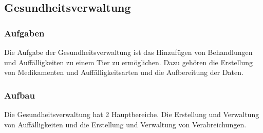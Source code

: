
\subsection{Gesundheitsverwaltung}

\subsubsection{Aufgaben}
Die Aufgabe der Gesundheitsverwaltung ist das Hinzufügen von Behandlungen und Auffälligkeiten zu einem Tier zu ermöglichen. Dazu gehören die Erstellung von Medikamenten und Auffälligkeitsarten und die Aufbereitung der Daten.
\subsubsection{Aufbau}
Die Gesundheitsverwaltung hat 2 Hauptbereiche. Die Erstellung und Verwaltung von Auffälligkeiten und die Erstellung und Verwaltung von Verabreichungen.
